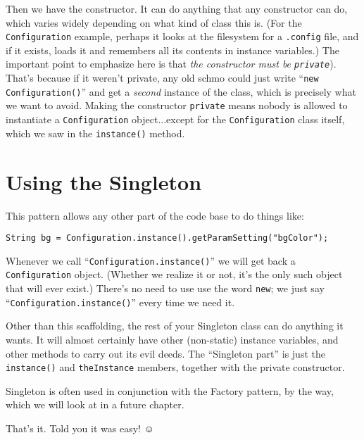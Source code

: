 Then we have the constructor. It can do anything that any constructor can do,
which varies widely depending on what kind of class this is. (For the
\texttt{Configuration} example, perhaps it looks at the filesystem for a
\texttt{.config} file, and if it exists, loads it and remembers all its
contents in instance variables.) The important point to emphasize here is that
\textit{the constructor must be \texttt{private}}). That's because if it
weren't private, any old schmo could just write ``\texttt{new
Configuration()}'' and get a \textit{second} instance of the class, which is
precisely what we want to avoid. Making the constructor \texttt{private} means
nobody is allowed to instantiate a \texttt{Configuration} object...except for
the \texttt{Configuration} class itself, which we saw in the
\texttt{instance()} method.


\section{Using the Singleton}

This pattern allows any other part of the code base to do things like:

\begin{Verbatim}[fontsize=\footnotesize,samepage=true,frame=single]
String bg = Configuration.instance().getParamSetting("bgColor");
\end{Verbatim}

Whenever we call ``\texttt{Configuration.instance()}'' we will get back a\\
\texttt{Configuration} object. (Whether we realize it or not, it's the only
such object that will ever exist.) There's no need to use use the word
\texttt{new}; we just say ``\texttt{Configuration.instance()}'' every time we
need it.

Other than this scaffolding, the rest of your Singleton class can do anything
it wants. It will almost certainly have other (non-static) instance variables,
and other methods to carry out its evil deeds. The ``Singleton part'' is just
the \texttt{instance()} and \texttt{theInstance} members, together with the
private constructor.

Singleton is often used in conjunction with the Factory pattern, by the way,
which we will look at in a future chapter.

That's it. Told you it was easy! $\smiley$
